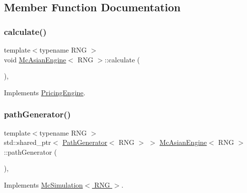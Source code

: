 \subsection{Member Function Documentation}
\hypertarget{class_mc_asian_engine_ac16f4259846f55dc6c02d0b628f34e63}{}\label{class_mc_asian_engine_ac16f4259846f55dc6c02d0b628f34e63} 
\subsubsection{\texorpdfstring{calculate()}{calculate()}}
{\footnotesize\ttfamily template$<$typename R\+NG $>$ \\
void \hyperlink{class_mc_asian_engine}{Mc\+Asian\+Engine}$<$ R\+NG $>$\+::calculate (\begin{DoxyParamCaption}{ }\end{DoxyParamCaption})\hspace{0.3cm}{\ttfamily [override]}, {\ttfamily [virtual]}}



Implements \hyperlink{class_pricing_engine_a733511ffc3cf5e4dc1fbc2a39208d8bd}{Pricing\+Engine}.

\hypertarget{class_mc_asian_engine_ae38592c71ae4d5d09c9eb13d7cc0c5ff}{}\label{class_mc_asian_engine_ae38592c71ae4d5d09c9eb13d7cc0c5ff} 
\subsubsection{\texorpdfstring{path\+Generator()}{pathGenerator()}}
{\footnotesize\ttfamily template$<$typename R\+NG $>$ \\
std\+::shared\+\_\+ptr$<$ \hyperlink{class_path_generator}{Path\+Generator}$<$ R\+NG $>$ $>$ \hyperlink{class_mc_asian_engine}{Mc\+Asian\+Engine}$<$ R\+NG $>$\+::path\+Generator (\begin{DoxyParamCaption}{ }\end{DoxyParamCaption})\hspace{0.3cm}{\ttfamily [override]}, {\ttfamily [virtual]}}



Implements \hyperlink{class_mc_simulation_a44086a1efd452d8644c9f2e52417038f}{Mc\+Simulation$<$ R\+N\+G $>$}.

\hypertarget{class_mc_asian_engine_a5b7351c28b68878b7f6d130eef293d6c}{}\label{class_mc_asian_engine_a5b7351c28b68878b7f6d130eef293d6c} 
